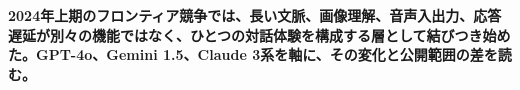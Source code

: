 \noindent\textbf{2024年上期のフロンティア競争では、長い文脈、画像理解、音声入出力、応答遅延が別々の機能ではなく、ひとつの対話体験を構成する層として結びつき始めた。GPT-4o、Gemini 1.5、Claude 3系を軸に、その変化と公開範囲の差を読む。}\autocite{src-28ee6f0f00f4,src-2d3a533e91db,src-e91e6f80eaac}
